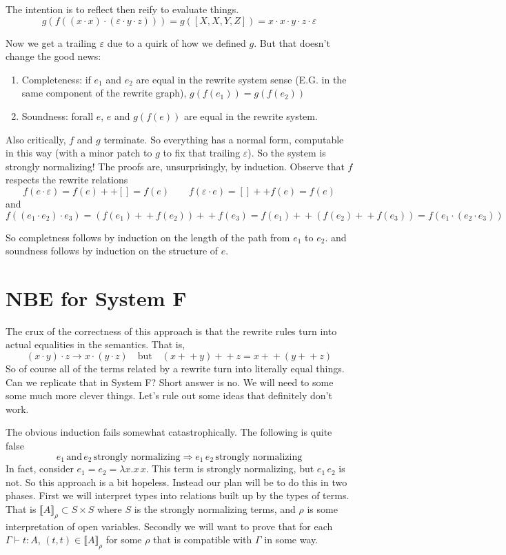 \documentclass[12pt]{article}
\begin{document}
The intention is to reflect then reify to evaluate things.
\[
  g(f( (x \cdot x) \cdot (\varepsilon \cdot y \cdot z))) = g ([X,X,Y,Z]) = x\cdot x \cdot y \cdot z \cdot \varepsilon
\]

Now we get a trailing $\varepsilon$ due to a quirk of how we defined $g$.
But that doesn't change the good news:
\begin{enumerate}
    \item Completeness: if $e_1$ and $e_2$ are equal in the rewrite system sense (E.G. in the same component of the rewrite graph), $g (f (e_1)) = g(f(e_2))$
    \item Soundness: forall $e$, $e$ and $g(f(e))$ are equal in the rewrite system.
\end{enumerate}
Also critically, $f$ and $g$ terminate.
So everything has a normal form, computable in this way (with a minor patch to $g$ to fix that trailing $\varepsilon$).
So the system is strongly normalizing!
The proofs are, unsurprisingly, by induction. 
Observe that $f$ respects the rewrite relations
\[
f (e\cdot \varepsilon ) = f(e) ++ [] = f(e)\quad\quad
  f (\varepsilon \cdot e ) = [] ++ f(e) = f(e)
\]
and 
\[
f ((e_1\cdot e_2) \cdot e_3) = (f(e_1) +\!+ f(e_2)) +\!+ f(e_3) = f(e_1) +\!+ (f(e_2) +\!+ f(e_3)) = f (e_1\cdot (e_2 \cdot e_3))
\]

So completness follows by induction on the length of the path from $e_1$ to $e_2$.
and soundness follows by induction on the structure of $e$.

\section{NBE for System F}
The crux of the correctness of this approach is that the rewrite rules turn into actual equalities in the semantics.
That is, 
\[
  (x\cdot y) \cdot z \rightarrow x \cdot (y \cdot z)\quad \text{but}\quad
    (x +\!+ y) +\!+ z = x +\!+ (y +\!+ z)
\]
So of course all of the terms related by a rewrite turn into literally equal things.
Can we replicate that in System F? 
Short answer is no. 
We will need to some some much more clever things.
Let's rule out some ideas that definitely don't work.

The obvious induction fails somewhat catastrophically. The following is quite false
\[
 e_1 \, \text{and}\, e_2\, \text{strongly normalizing} \Rightarrow e_1 \, e_2\, \text{strongly normalizing}
\]
In fact, consider $e_1 = e_2 = \lambda x. x \, x$. 
This term is strongly normalizing, but $e_1 \, e_2$ is not.
So this approach is a bit hopeless.
Instead our plan will be to do this in two phases.
First we will interpret types into relations built up by the types of terms.
That is $\llbracket A \rrbracket_\rho \subset S \times S$ where $S$ is the strongly normalizing terms, and $\rho$ is some interpretation of open variables.
Secondly we will want to prove that for each $\Gamma \vdash t : A$, $(t,t) \in \llbracket A \rrbracket_\rho$ for some $\rho$ that is compatible with $\Gamma$ in some way.
\end{document}
